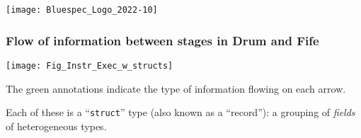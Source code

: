 



\date{L5: {\BSV} Structs; Memory requests and responses}





\begin{frame}
 \titlepage

 \begin{center}
  \texttt{[image: Bluespec\_Logo\_2022-10]}
 \end{center}

\end{frame}





\begin{frame}
\frametitle{Flow of information between stages in Drum and Fife}

\footnotesize

\begin{center}
\texttt{[image: Fig\_Instr\_Exec\_w\_structs]}
\end{center}

\vspace*{2ex}

The green annotations indicate the type of information flowing on each arrow.

Each of these is a ``{\tt struct}'' type (also known as a ``record''):
a grouping of \emph{fields} of heterogeneous types.

\end{frame}


